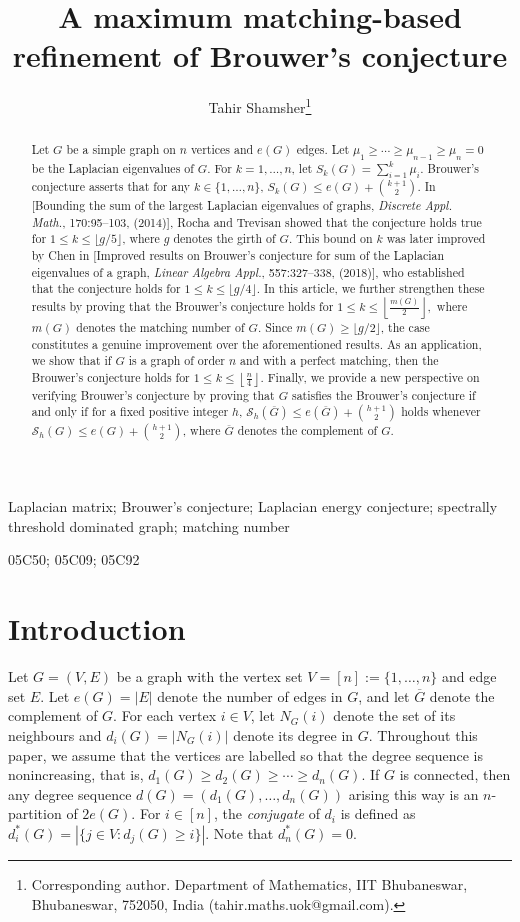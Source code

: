 \documentclass[12pt]{article}
\title{A maximum matching-based refinement of Brouwer’s conjecture }
\author{ Tahir Shamsher\footnote{Corresponding author. Department of Mathematics, IIT Bhubaneswar, Bhubaneswar, 752050, India (tahir.maths.uok@gmail.com).} 
 }
\date{}
\theoremstyle{plain}
\theoremstyle{definition}
\begin{document}
\maketitle
\begin{abstract}
Let $G$ be a simple graph on $n$ vertices and $e(G)$ edges. Let $\mu_1\geq \cdots \geq \mu_{n-1}\geq \mu_n=0$ be the Laplacian eigenvalues of $G$. For $k=1, \ldots, n$, let $S_k(G)=\sum_{i=1}^{k}\mu_i$. Brouwer’s conjecture asserts that for any $k\in\{1,\ldots, n\}$, $S_k(G)\leq e(G)+\binom{k+1}{2}$. In [Bounding the sum of the largest Laplacian eigenvalues of graphs, {\em Discrete Appl. Math.}, 170:95--103, (2014)], Rocha and Trevisan showed that the conjecture holds true for $1 \leq k \leq \lfloor g/5 \rfloor$, where $g$ denotes the girth of $G$. This bound on $k$ was later improved by Chen in [Improved results on Brouwer’s conjecture for sum of the Laplacian eigenvalues of a graph, {\em Linear Algebra Appl.}, 557:327--338, (2018)], who established that the conjecture holds for $1 \leq k \leq \lfloor g/4 \rfloor$. In this article, we further strengthen these results by proving that the Brouwer’s conjecture holds for $1\leq k\leq\left\lfloor \frac{m(G)}{2}\right\rfloor,$ where $m(G)$ denotes the matching number of $G$. Since $m(G)\geq \lfloor g/2\rfloor$, the case constitutes a genuine improvement over the aforementioned results. As an application, we show that if $G$ is a graph of order $n$ and with a perfect matching, then the Brouwer’s conjecture holds for $1\leq k\leq \left\lfloor \frac{n}{4}\right\rfloor$. Finally, we provide a new perspective on verifying Brouwer’s conjecture by proving that $G$ satisfies the Brouwer's conjecture if and only if for a fixed positive integer $h$, $\mathcal{S}_h(\overline{G})\leq e(\overline{G})+\binom{h+1}{2}$ holds whenever $\mathcal{S}_h(G)\leq e(G)+\binom{h+1}{2}$, where $\overline{G}$ denotes the complement of $G$.
\end{abstract}
	
 Laplacian matrix; Brouwer's conjecture; Laplacian energy conjecture; spectrally threshold dominated graph; matching number 

 05C50; 05C09; 05C92
	
\section{Introduction}\label{sec1}
Let $G=(V,E)$ be a graph with the vertex set $V=[n]:=\{1,\ldots,n\}$ and edge set $E$. Let $e(G)=|E|$ denote the number of edges in $G$, and let $\overline{G}$ denote the complement of $G$. For each vertex $i\in V$, let $N_G(i)$ denote the set of its neighbours and $d_i(G)=|N_G(i)|$ denote its degree in $G$. Throughout this paper, we assume that the vertices are labelled so that the degree sequence is nonincreasing, that is, $d_1(G)\geq d_2(G)\geq\cdots\geq d_n(G)$. If $G$ is connected, then any degree sequence $d(G)=(d_1(G),\ldots,d_n(G))$ arising this way is an $n$-partition of $2e(G)$. For $i\in [n]$, the {\em conjugate} of $d_i$ is defined as $d_i^*(G)=|\{j\in V:d_j(G)\geq i\}|$. Note that $d_n^*(G)=0$. 
\end{document}
